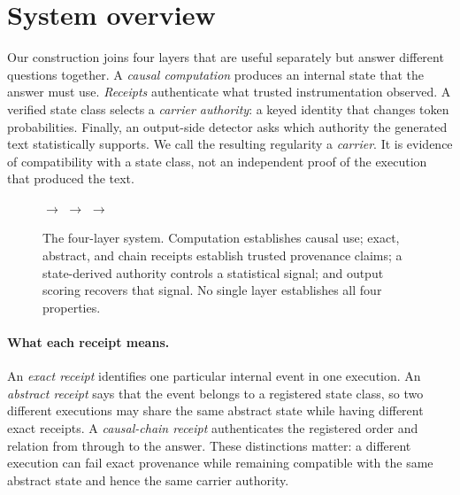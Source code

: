 \section{System overview}

Our construction joins four layers that are useful separately but answer different
questions together.  A \emph{causal computation} produces an internal state that
the answer must use.  \emph{Receipts} authenticate what trusted instrumentation
observed.  A verified state class selects a \emph{carrier authority}: a keyed
identity that changes token probabilities.  Finally, an output-side detector asks
which authority the generated text statistically supports.  We call the resulting
regularity a \emph{carrier}.  It is evidence of compatibility with a state class,
not an independent proof of the execution that produced the text.

\begin{figure}[t]
  \centering
  \small
  $\rightarrow$
  $\rightarrow$
  $\rightarrow$
  \caption{The four-layer system. Computation establishes causal use; exact,
  abstract, and chain receipts establish trusted provenance claims; a
  state-derived authority controls a statistical signal; and output scoring
  recovers that signal. No single layer establishes all four properties.}
  \label{fig:overview}
\end{figure}

\paragraph{What each receipt means.}
An \emph{exact receipt} identifies one particular internal event in one
execution.  An \emph{abstract receipt} says that the event belongs to a
registered state class, so two different executions may share the same abstract
state while having different exact receipts.  A \emph{causal-chain receipt}
authenticates the registered order and relation from \ztwo{} through \zthree{} to
the answer.  These distinctions matter: a different execution can fail exact
provenance while remaining compatible with the same abstract state and hence
the same carrier authority.

